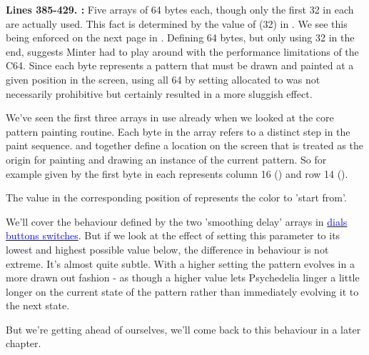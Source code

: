 \textbf{Lines 385-429. :} Five arrays of 64 bytes each, though only the first 32 in each are actually used. This fact is determined
by the value of  (32) in . We see this being enforced on the next page in
. Defining 64 bytes, but only using 32 in the end, suggests Minter had to play around
with the performance limitations of the C64. Since each byte represents a pattern that must be drawn and painted
at a given position in the screen, using all 64 by setting allocated  to  
was not necessarily prohibitive but certainly resulted in a more sluggish effect.

We've seen the first three arrays in use already when we looked at the core
pattern painting routine. Each byte in the array refers to a distinct step in the paint sequence.
 and  together define a location on the screen
that is treated as the origin for painting and drawing an instance of the current pattern. So for example  given by the
first byte in each represents column 16 () and row 14 (). 

The value in
the corresponding position of  represents the color to 'start from'.

We'll cover the behaviour defined by the two 'smoothing delay' arrays in 
\hyperref[sec:dials]{\textcolor{blue}{dials buttons switches}}.
But if we look at the effect of setting this parameter to its lowest and
highest possible value below, the difference in behaviour is not
extreme. It's almost quite subtle. With a higher setting the pattern
evolves in a more drawn out fashion - as though a higher value lets
Psychedelia linger a little longer on the current state of the pattern
rather than immediately evolving it to the next state.

But we're getting ahead of ourselves, we'll come back to this behaviour in a later chapter.

